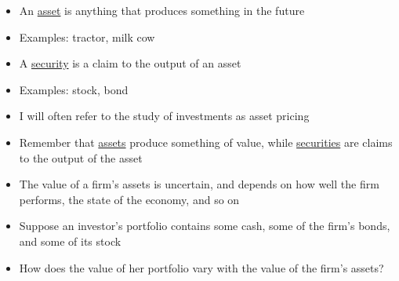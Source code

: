 \documentclass{beamer}
\begin{document}
\begin{frame}{}
	\begin{itemize}
		\item An \underline{asset} is anything that produces something in the future
		\item Examples: tractor, milk cow
		\item A \underline{security} is a claim to the output of an asset
		\item Examples: stock, bond
		\item I will often refer to the study of investments as asset pricing
	\end{itemize}
\end{frame}

\begin{frame}{}
	\begin{itemize}
		\item Remember that \underline{assets} produce something of value, while \underline{securities} are claims to the output of the asset
		\item The value of a firm's assets is uncertain, and depends on how well the firm performs, the state of the economy, and so on
		\item Suppose an investor's portfolio contains some cash, some of the firm's bonds, and some of its stock
		\item How does the value of her portfolio vary with the value of the firm's assets?
	\end{itemize}
\end{frame}

\begin{frame}{}
	\begin{center}
	\end{center}
\end{frame}
\end{document}
